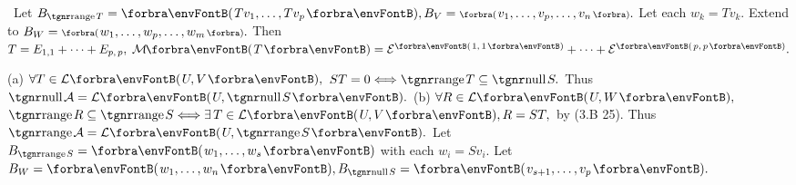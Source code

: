 \BulletPointX\Tips \,\,\,Let $B_{\range T}=\Par{Tv_1,\dots,Tv_p},B_V=\BigPar{v_1,\dots,v_p,\dots,v_n}.$ Let each $w_k=Tv_k.$\TextB{\vspace{2pt}}\IndentTips{}
Extend to $B_W=\BigPar{w_1,\dots,w_p,\dots,w_m}.$ Then $T=E_{1,1}+\dots+E_{p,\,p},\;\Mt{T}=\mEnt{1,\,1}+\dots+\mEnt{p,\,p}.$
\SepLine



(a) $\forall T\in\Lm{U,V},$ $ST=0\Longleftrightarrow\range T\subseteq\null S.$ Thus $\null\mA=\Lm{U,\null S}.$\parSol{\vspace{2pt}}
(b) $\forall R\in\Lm{U,W},$ $\range R\subseteq\range S \Longleftrightarrow\exists\,T\in\Lm{U,V},R=ST,$ by (3.B 25).\parSol{\Hb}
Thus $\range\mA=\Lm{U,\range S}.$\PfEnd\vspace{4pt}\quad
\Or Let $B_{\range S}=\Par{w_1,\dots,w_s}$ with each $w_i=Sv_i.$ Let $B_W=\Par{w_1,\dots,w_n},B_{\null S}=\Par{v_{s+1},\dots,v_p}.$\par\vspace{0pt}\quad
